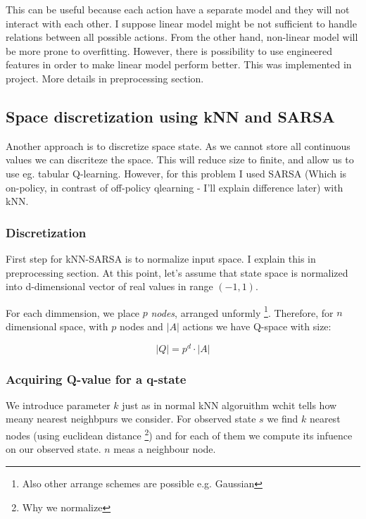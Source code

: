 \documentclass[12pt]{article}
\begin{document}
This can be useful because each action have a separate model and they will not interact with each other. I suppose linear model might be not sufficient to handle relations between all possible actions. From the other hand, non-linear model will be more prone to overfitting. However, there is possibility to use engineered features in order to make linear model perform better. This was implemented in project. More details in preprocessing section. 

\subsection{Space discretization using kNN and SARSA}
Another approach is to discretize space state. As we cannot store all continuous values we can discriteze the space. This will reduce size to finite, and allow us to use eg. tabular Q-learning. However, for this problem I used SARSA (Which is on-policy, in contrast of off-policy qlearning - I'll explain difference later) with kNN.

\subsubsection{Discretization}

First step for kNN-SARSA is to normalize input space. I explain this in preprocessing section. At this point, let's assume that state space is normalized into d-dimensional vector of real values in range $(-1, 1)$.

For each dimmension, we place $p$ \emph{nodes}, arranged unformly \footnote{Also other arrange schemes are possible e.g. Gaussian}. Therefore, for $n$ dimensional space, with $p$ nodes and $|A|$ actions we have Q-space with size:

\begin{equation}
|Q| = p^d \cdot |A|
\end{equation}

\subsubsection{Acquiring Q-value for a q-state}

We introduce parameter $k$ just as in normal kNN algoruithm wchit tells how meany nearest neighbpurs we consider. For observed state $s$ we find $k$ nearest nodes (using euclidean distance \footnote{Why we normalize}) and for each of them we compute its infuence on our observed state. $n$ meas a neighbour node.
\end{document}
